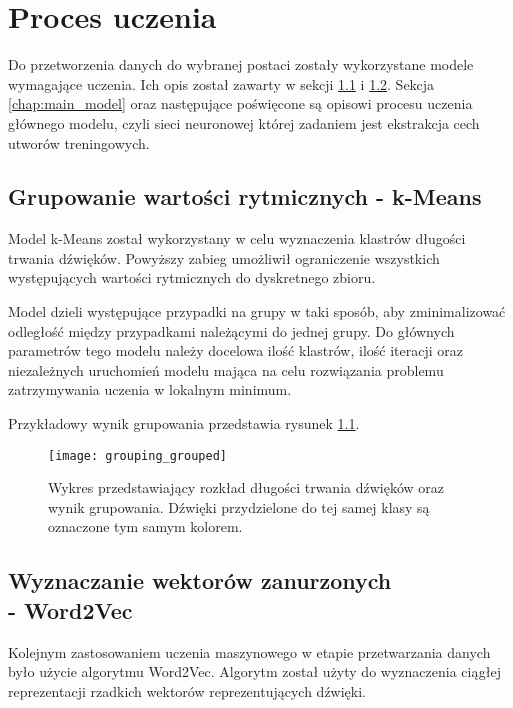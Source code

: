 \chapter{Proces uczenia}\label{chap:training}
{
    Do przetworzenia danych do wybranej postaci zostały wykorzystane modele wymagające uczenia.
    Ich opis został zawarty w sekcji \ref{chap:models_data_k} i \ref{chap:models_data_v}. Sekcja \ref{chap:main_model} oraz następujące
    poświęcone są opisowi procesu uczenia głównego modelu, czyli sieci neuronowej której 
    zadaniem jest ekstrakcja cech utworów treningowych.

    \section{Grupowanie wartości rytmicznych - k-Means}\label{chap:models_data_k}
    {
        Model k-Means został wykorzystany w celu wyznaczenia klastrów
        długości trwania dźwięków. Powyższy zabieg umożliwił ograniczenie wszystkich występujących 
        wartości rytmicznych do dyskretnego zbioru. 
        
        Model dzieli występujące przypadki na grupy w taki sposób, aby zminimalizować odległość 
        między przypadkami należącymi do jednej grupy.
        Do głównych parametrów tego modelu należy docelowa ilość klastrów, ilość iteracji
        oraz niezależnych uruchomień modelu mająca na celu rozwiązania problemu zatrzymywania uczenia w lokalnym minimum.

        Przykładowy wynik grupowania przedstawia rysunek \ref{grouping}.

        \begin{figure}[H]
            \centering
            \texttt{[image: grouping\_grouped]}
            \caption{Wykres przedstawiający rozkład długości trwania dźwięków oraz wynik grupowania. Dźwięki przydzielone do tej samej klasy są oznaczone tym samym kolorem.}
            \label{grouping}
        \end{figure}
    }

    \section{Wyznaczanie wektorów zanurzonych \\ - Word2Vec}\label{chap:models_data_v}
    {
        Kolejnym zastosowaniem uczenia maszynowego w etapie przetwarzania danych było użycie algorytmu Word2Vec. Algorytm 
        został użyty do wyznaczenia ciągłej reprezentacji rzadkich wektorów reprezentujących dźwięki.
        
}}
